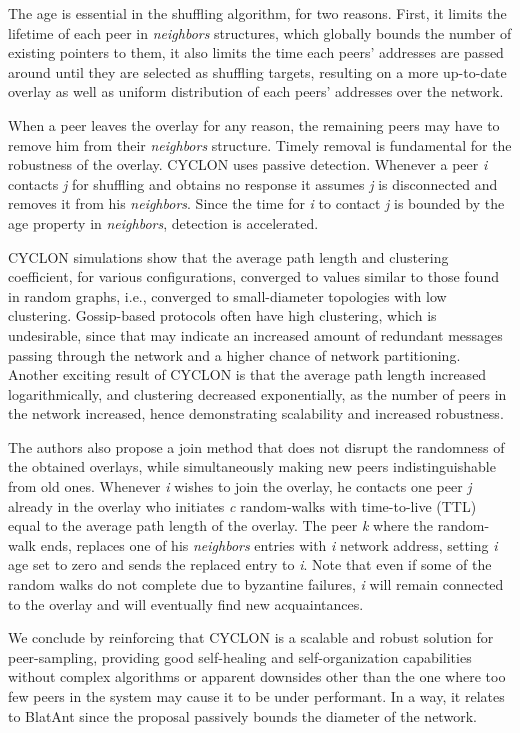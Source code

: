 \documentclass[runningheads]{llncs}
\begin{document}
The age is essential in the shuffling algorithm, for two reasons. First, it limits the lifetime of each peer in \textit{neighbors} structures, which globally bounds the number of existing pointers to them, it also limits the time each peers' addresses are passed around until they are selected as shuffling targets, resulting on a more up-to-date overlay as well as uniform distribution of each peers' addresses over the network.

When a peer leaves the overlay for any reason, the remaining peers may have to remove him from their \textit{neighbors} structure. Timely removal is fundamental for the robustness of the overlay.  CYCLON uses passive detection. Whenever a peer \textit{i} contacts \textit{j} for shuffling and obtains no response it assumes \textit{j} is disconnected and removes it from his \textit{neighbors}. Since the time for \textit{i} to contact \textit{j} is bounded by the age property in \textit{neighbors}, detection is accelerated.

CYCLON simulations show that the average path length and clustering coefficient, for various configurations, converged to values similar to those found in random graphs, i.e., converged to small-diameter topologies with low clustering. Gossip-based protocols often have high clustering, which is undesirable, since that may indicate an increased amount of redundant messages passing through the network and a higher chance of network partitioning. Another exciting result of CYCLON is that the average path length increased logarithmically, and clustering decreased exponentially, as the number of peers in the network increased, hence demonstrating scalability and increased robustness.

The authors also propose a join method that does not disrupt the randomness of the obtained overlays, while simultaneously making new peers indistinguishable from old ones. Whenever \textit{i} wishes to join the overlay, he contacts one peer \textit{j} already in the overlay who initiates \textit{c} random-walks with time-to-live (TTL) equal to the average path length of the overlay. The peer \textit{k} where the random-walk ends, replaces one of his \textit{neighbors} entries with \textit{i} network address, setting \textit{i} age set to zero and sends the replaced entry to \textit{i}. Note that even if some of the random walks do not complete due to byzantine failures, \textit{i} will remain connected to the overlay and will eventually find new acquaintances.

We conclude by reinforcing that CYCLON is a scalable and robust solution for peer-sampling, providing good self-healing and self-organization capabilities without complex algorithms or apparent downsides other than the one where too few peers in the system may cause it to be under performant. In a way, it relates to BlatAnt since the proposal passively bounds the diameter of the network.
\end{document}
